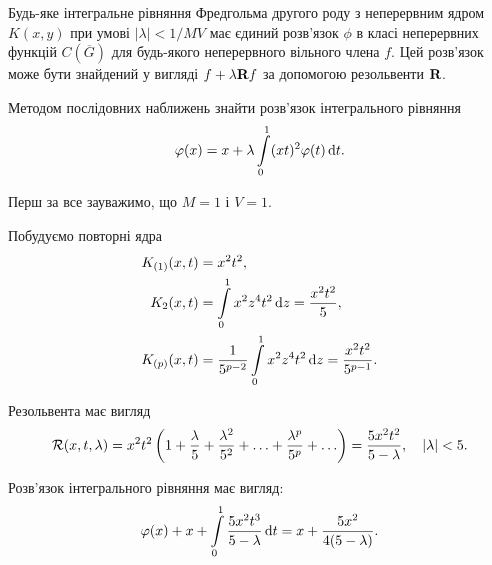 \begin{theorem}
	Будь-яке інтегральне рівняння Фредгольма другого роду з неперервним ядром $K(x, y)$ при умові $|\lambda| < 1 / MV$ має єдиний розв'язок $\phi$ в класі неперервних функцій $C\left(\overline G\right)$ для будь-якого неперервного вільного члена $f$. Цей розв'язок може бути знайдений у вигляді $f + \lambda \bf{R} f$ за допомогою резольвенти $\bf{R}$.
\end{theorem}

\begin{example}
	Методом послідовних наближень знайти розв'язок інтегрального рівняння \begin{equation*}\phi(x) = x + \lambda \Int_0^1 (xt)^2 \phi(t) \diff t.\end{equation*}
\end{example}

\begin{solution}
	Перш за все зауважимо, що $M = 1$ і $V = 1$. \medskip

	Побудуємо повторні ядра 
	\begin{equation*}
		\begin{aligned} 
			K_{(1)}(x, t) &= x^2t^2, \\
			K_2(x, t) &= \Int_0^1 x^2 z^4 t^2 \diff z = \dfrac{x^2t^2}{5}, \\ 
			K_{(p)}(x, t) &= \dfrac{1}{5^{p - 2}} \Int_0^1 x^2 z^4 t^2 \diff z = \dfrac{x^2t^2}{5^{p - 1}}.
		\end{aligned}
	\end{equation*}
		
	Резольвента має вигляд 
	\begin{equation*}
		\cal{R}(x, t, \lambda) = x^2 t^2 \left(1 + \frac{\lambda}{5} + \frac{\lambda^2}{5^2} + \ldots + \frac{\lambda^p}{5^p} + \ldots \right) = \frac{5x^2t^2}{5 - \lambda}, \quad |\lambda| < 5.
	\end{equation*}

	Розв'язок інтегрального рівняння має вигляд: 
	\begin{equation*}
		\phi(x) + x + \Int_0^1 \dfrac{5x^2t^3}{5 - \lambda} \diff t = x + \dfrac{5x^2}{4(5 - \lambda)}.
	\end{equation*}
\end{solution}

